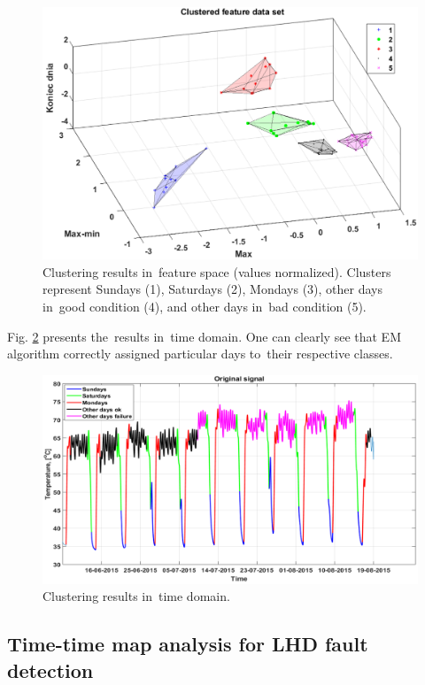 \begin{figure}[ht!]
\centering
\includegraphics[width = \textwidth]{wykresy/clustered.png}
\caption{Clustering results in~feature space (values normalized). Clusters represent Sundays (1), Saturdays (2), Mondays (3), other days in~good condition (4), and other days in~bad condition (5).}
\label{fig: clustered}
\end{figure}

Fig. \ref{fig: cplot} presents the~results in~time domain. One can clearly see that EM algorithm correctly assigned particular days to~their respective classes.

\begin{figure}[ht!]
\centering
\includegraphics[width = \textwidth]{wykresy/cplot.png}
\caption{Clustering results in~time domain.}
\label{fig: cplot}
\end{figure}

\subsection{Time-time map analysis for LHD fault detection}\label{real_bulgaria}

